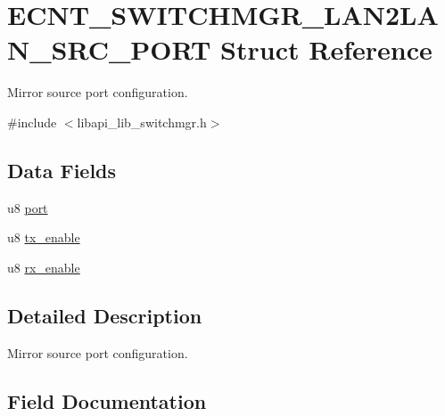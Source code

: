 \hypertarget{structECNT__SWITCHMGR__LAN2LAN__SRC__PORT}{}\section{E\+C\+N\+T\+\_\+\+S\+W\+I\+T\+C\+H\+M\+G\+R\+\_\+\+L\+A\+N2\+L\+A\+N\+\_\+\+S\+R\+C\+\_\+\+P\+O\+RT Struct Reference}
\label{structECNT__SWITCHMGR__LAN2LAN__SRC__PORT}


Mirror source port configuration.  




{\ttfamily \#include $<$libapi\+\_\+lib\+\_\+switchmgr.\+h$>$}

\subsection*{Data Fields}
\begin{DoxyCompactItemize}
\item 
u8 \hyperlink{structECNT__SWITCHMGR__LAN2LAN__SRC__PORT_ae1bebeabe1a87a17d9b3c3ebfc319243}{port}
\item 
u8 \hyperlink{structECNT__SWITCHMGR__LAN2LAN__SRC__PORT_ab38cc11a09e7860b03a99f71b5c06929}{tx\+\_\+enable}
\item 
u8 \hyperlink{structECNT__SWITCHMGR__LAN2LAN__SRC__PORT_a0628f592c6906e71ac4de2e8496e4485}{rx\+\_\+enable}
\end{DoxyCompactItemize}


\subsection{Detailed Description}
Mirror source port configuration. 

\subsection{Field Documentation}
\mbox{\label{structECNT__SWITCHMGR__LAN2LAN__SRC__PORT_ae1bebeabe1a87a17d9b3c3ebfc319243}} 
